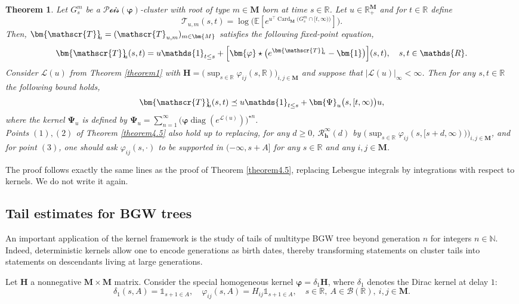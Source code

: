 \documentclass[reqno,final,11pt]{amsart}
\theoremstyle{plain}
\newtheorem{theorem}{Theorem}[section]
\theoremstyle{definition}
\theoremstyle{remark}
\newcommand{\R}{\mathds{R}}
\newcommand{\N}{\mathds{N}}
\newcommand{\ind}{\mathds{1}}
\newcommand{\E}[1]{\mathds{E}\left[#1\right]}
\newcommand{\M}{\bm{M}}
\renewcommand{\L}{\bm{\mathscr{L}}}
\newcommand{\ones}{\bm{1}}
\newcommand{\h}{\bm{h}}
\newcommand{\Ta}{\mathscr{T}}
\newcommand{\bTa}[1]{\bm{\mathscr{T}}_{\mkern-7mu #1}}
\renewcommand{\H}{\bm{H}}
\newcommand{\pos}{\R_+^{\M}}
\newcommand{\Pois}{\mathscr{P}\!\mathscr{o}\!\mathscr{i}\!\mathscr{s}}
\newcommand{\Res}{\mathcal{R}}
\newcommand{\trp}{^{\intercal}}
\DeclareMathOperator{\card}{Card}
\DeclareMathOperator{\diag}{diag}
\begin{document}
\begin{theorem}\label{theorem4.6}
    Let $G^m_s$ be a $\Pois(\bm{\varphi})$-cluster with root of type $m\in\M$ born at time $s\in\R$. Let $u\in \pos$ and for $t\in\R$ define
\[\Ta_{u,m}(s,t) = \log\bigg( \E{e^{u\trp \card_{\M}\big(G^{m}_s \cap [t,\infty)\big)}} \bigg).\]
Then, $\bTa{u}=(\Ta_{u,m})_{m\in\M}$ satisfies the following fixed-point equation,
\begin{equation}\label{eq4.6}
        \bTa{u}(s,t) =  u \ind_{t\leq s}  + \Big[\bm{\varphi} \star \big(e^{\bTa{u}}-\ones \big)\Big](s,t), \quad s,t\in\R.
\end{equation}
	Consider $\L(u)$ from Theorem \ref{theorem1} with $\H = \big(\sup_{s\in\R}\varphi_{ij}(s,\R)\big)_{i,j\in\M}$ and suppose that $\vert \L(u)\vert_{\infty}<\infty$. Then for any $s,t\in\R$ the following bound holds,
	\begin{equation}\label{eq4.5}
		\bTa{u}(s,t) \preceq  u\ind_{t\leq s} + \bm{\Psi}_u\big(s,[t,\infty)\big)u,
	\end{equation}
where the kernel $\bm{\Psi}_u$ is defined by $\displaystyle\bm{\Psi}_u = \sum_{n=1}^{\infty}\big( \bm{\varphi} \diag(e^{\L(u)}) \big)^{\star n}$.\\
Points $(1),(2)$ of Theorem \ref{theorem4.5} also hold up to replacing, for any $d\geq 0$, $\Res^{\infty}_{\h}(d)$ by $\big(\sup_{s\in\R}\varphi_{ij}(s,[s+d,\infty))\big)_{i,j\in\M}$, and for point $(3)$, one should ask $\varphi_{ij}(s,\cdot)$ to be supported in $(-\infty,s+A]$ for any $s\in\R$ and any $i,j\in\M$.
\end{theorem}

The proof follows exactly the same lines as the proof of Theorem \ref{theorem4.5}, replacing Lebesgue integrals by integrations with respect to kernels. We do not write it again.

\subsection{Tail estimates for BGW trees}\label{sec3.3}

An important application of the kernel framework is the study of tails of multitype BGW tree beyond generation $n$ for integers $n\in\N$. Indeed, deterministic kernels allow one to encode generations as birth dates, thereby transforming statements on cluster tails into statements on descendants living at large generations.

Let $\H$ a nonnegative $\M\times\M$ matrix. Consider the special homogeneous kernel $\bm{\varphi}=\delta_1\H$,
where $\delta_1$ denotes the Dirac kernel at delay $1$:
\[\delta_1(s,A) = \ind_{s+1\in A}, \quad \varphi_{ij}(s,A) = H_{ij} \ind_{s+1\in A}, \quad s\in\R, \ A\in\mathcal{B}(\R), \ i,j\in\M.\]
\end{document}
